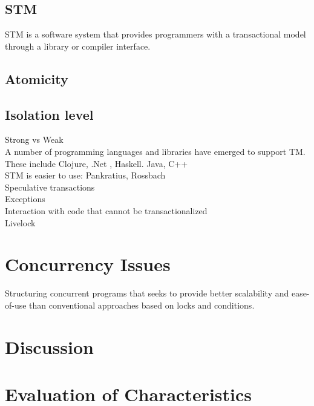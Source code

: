 \subsection{\ac{STM}}
STM is a software system that provides programmers with a transactional model through a library or compiler interface\cite{scott2011sync}.

\subsection{Atomicity}

\subsection{Isolation level}
Strong vs Weak\\





A number of programming languages and libraries have emerged to support TM. These include Clojure, .Net , Haskell. Java, C++\\
STM is easier to use: Pankratius, Rossbach\\
Speculative transactions\\

Exceptions\\
Interaction with code that cannot be transactionalized\\
Livelock\\
\section{Concurrency Issues}
\label{sec:stm_issues}
Structuring concurrent programs that seeks to provide better scalability and ease-of-use than conventional approaches based on locks and conditions.

\section{Discussion}
\label{sec:stm_discussion}


\section{Evaluation of Characteristics}
\label{sec:stm_eval}

\worksheetend